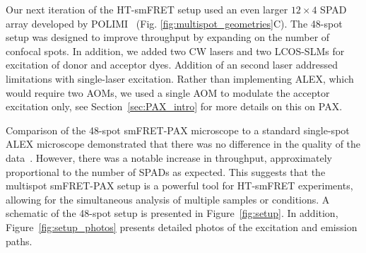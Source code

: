 Our next iteration of the \ac{HT-smFRET} setup used an even larger $12\times4$ \ac{SPAD} array developed by \ac{POLIMI}~\cite{gulinatti_SPIE_2012, ingargiola_JCP_2018} (Fig. \ref{fig:multispot_geometries}C). 
The 48-spot setup was designed to improve throughput by expanding on the number of confocal spots.
In addition, we added two \ac{CW} lasers and two \ac{LCOS-SLM}s for excitation of donor and acceptor dyes.
Addition of an second laser addressed limitations with single-laser excitation.
Rather than implementing \ac{ALEX}, which would require two \ac{AOM}s, we used a single \ac{AOM} to modulate the acceptor excitation only, see Section~\ref{sec:PAX_intro} for more details on this on \ac{PAX}.

Comparison of the 48-spot smFRET-PAX microscope to a standard single-spot ALEX microscope demonstrated that there was no difference in the quality of the data~\cite{ingargiola_JCP_2018}. 
However, there was a notable increase in throughput, approximately proportional to the number of \ac{SPAD}s as expected. 
This suggests that the multispot smFRET-PAX setup is a powerful tool for \ac{HT-smFRET} experiments, allowing for the simultaneous analysis of multiple samples or conditions. 
A schematic of the 48-spot setup is presented in Figure~\ref{fig:setup}.
In addition, Figure~\ref{fig:setup_photos} presents detailed photos of the excitation and emission paths.

